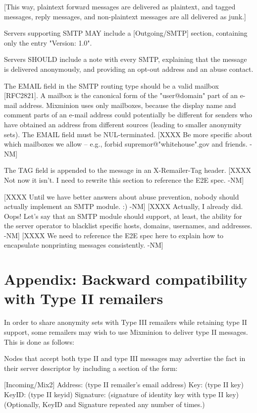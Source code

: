 [This way, plaintext forward messages are delivered as plaintext,
and tagged messages, reply messages, and non-plaintext messages are
all delivered as junk.]

Servers supporting SMTP MAY include a [Outgoing/SMTP] section,
containing only the entry "Version: 1.0".

Servers SHOULD include a note with every SMTP, explaining that the
message is delivered anonymously, and providing an opt-out address and
an abuse contact.

The EMAIL field in the SMTP routing type should be a valid mailbox
[RFC2821]. A mailbox is the canonical form of the "user@domain"
part of an e-mail address. Mixminion uses only mailboxes, because the
display name and comment parts of an e-mail address could potentially be
different for senders who have obtained an address from different
sources (leading to smaller anonymity sets). The EMAIL field must be
NUL-terminated.
[XXXX Be more specific about which mailboxes we allow -- e.g., forbid
  supremor@"whitehouse".gov and friends. -NM]

The TAG field is appended to the message in an X-Remailer-Tag header.
[XXXX Not now it isn't.  I need to rewrite this section to reference
the E2E spec. -NM]

[XXXX Until we have better answers about abuse prevention, nobody should
  actually implement an SMTP module. :) -NM]
[XXXX Actually, I already did.  Oops!  Let's say that an SMTP module
  should support, at least, the ability for the server operator to
  blacklist specific hosts, domains, usernames, and addresses. -NM]
[XXXX We need to reference the E2E spec here to explain how to
  encapsulate nonprinting messages consistently. -NM]

\section{Appendix: Backward compatibility with Type II remailers}

In order to share anonymity sets with Type III remailers while
retaining type II support, some remailers may wish to use Mixminion to
deliver type II messages.  This is done as follows:

Nodes that accept both type II and type III messages may advertise the
fact in their server descriptor by including a section of the form:
 
         [Incoming/Mix2]
         Address: (type II remailer's email address)
         Key: (type II key)
         KeyID: (type II keyid)
         Signature: (signature of identity key with type II key)
         (Optionally, KeyID and Signature repeated any number of
                      times.)


